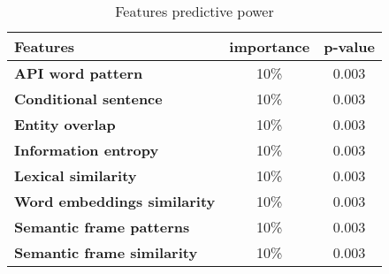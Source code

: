 \begin{table}[H]
\centering    
\begin{small}
\begin{tabular}{lcc}

\hline

\textbf{Features} & \textbf{importance} & \textbf{p-value} \\

\hline

\textbf{API word pattern} & 10\% & 0.003 \\

\textbf{Conditional sentence} & 10\% & 0.003 \\

\textbf{Entity overlap} & 10\% & 0.003 \\

\textbf{Information entropy} & 10\% & 0.003 \\

\textbf{Lexical similarity} & 10\% & 0.003 \\

\textbf{Word embeddings similarity} & 10\% & 0.003 \\  

\textbf{Semantic frame patterns} & 10\% & 0.003 \\

\textbf{Semantic frame similarity} & 10\% & 0.003 \\

\hline

\end{tabular}
\end{small}
\caption{Features predictive power}
\label{tbl:features-chi-square}
\end{table}

